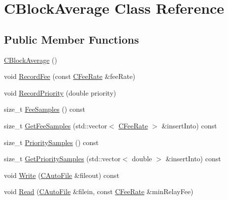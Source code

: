 \hypertarget{class_c_block_average}{}\section{C\+Block\+Average Class Reference}
\label{class_c_block_average}
\subsection*{Public Member Functions}
\begin{DoxyCompactItemize}
\item 
\hyperlink{class_c_block_average_adec219b95a2e1c67471f188dee48fb3a}{C\+Block\+Average} ()
\item 
void \hyperlink{class_c_block_average_a50af3241dc8fb3e49e1e980ed2a7fc95}{Record\+Fee} (const \hyperlink{class_c_fee_rate}{C\+Fee\+Rate} \&fee\+Rate)
\item 
void \hyperlink{class_c_block_average_ae4d71208ccf3ecd85751ce3644d12853}{Record\+Priority} (double priority)
\item 
size\+\_\+t \hyperlink{class_c_block_average_a9e63c1415286edf12ac82145723e564f}{Fee\+Samples} () const 
\item 
size\+\_\+t \hyperlink{class_c_block_average_a43152caddf026ec3f430d55435735ee4}{Get\+Fee\+Samples} (std\+::vector$<$ \hyperlink{class_c_fee_rate}{C\+Fee\+Rate} $>$ \&insert\+Into) const 
\item 
size\+\_\+t \hyperlink{class_c_block_average_a5b6ca2bd5fe9093ba81af14d7882145d}{Priority\+Samples} () const 
\item 
size\+\_\+t \hyperlink{class_c_block_average_a5f56bd04cccb15d891f7dfb41af8b382}{Get\+Priority\+Samples} (std\+::vector$<$ double $>$ \&insert\+Into) const 
\item 
void \hyperlink{class_c_block_average_a2c549117b02d3366cbc840dbdf5ebd6b}{Write} (\hyperlink{class_c_auto_file}{C\+Auto\+File} \&fileout) const 
\item 
void \hyperlink{class_c_block_average_aac4081eec4bf68d7d3a07521ea953489}{Read} (\hyperlink{class_c_auto_file}{C\+Auto\+File} \&filein, const \hyperlink{class_c_fee_rate}{C\+Fee\+Rate} \&min\+Relay\+Fee)
\end{DoxyCompactItemize}
